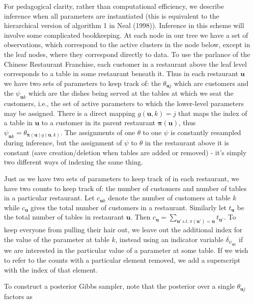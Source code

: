\documentclass[11pt]{article}
\begin{document}
For pedagogical clarity, rather than computational efficiency, we describe inference when all parameters are instantiated (this is equivalent to the hierarchical version of algorithm 1 in Neal (1998)).  Inference in this scheme will involve some complicated bookkeeping.  At each node in our tree we have a set of observations, which correspond to the active clusters in the node below, except in the leaf nodes, where they correspond directly to data.  To use the parlance of the Chinese Restaurant Franchise, each customer in a restaurant above the leaf level corresponds to a table in some restaurant beneath it.  Thus in each restaurant $\mathbf{u}$ we have two sets of parameters to keep track of: the $\theta_{\mathbf{u}j}$ which are customers and the $\psi_{\mathbf{u}k}$ which are the dishes being served at the tables at which we seat the customers, i.e., the set of active parameters to which the lower-level parameters may be assigned.  There is a direct mapping $g(\mathbf{u},k) = j$ that maps the index of a table in $\mathbf{u}$ to a customer in its parent restaurant $\mathbf{\pi(u)}$, thus $\psi_{\mathbf{u}k} = \theta_{\mathbf{\pi(u)}g(\mathbf{u},k)}$.  The assignments of one $\theta$ to one $\psi$ is constantly resampled during inference, but the assignment of $\psi$ to $\theta$ in the restaurant above it is constant (save creation/deletion when tables are added or removed) - it's simply two different ways of indexing the same thing.

Just as we have two sets of parameters to keep track of in each restaurant, we have two counts to keep track of: the number of customers and number of tables in a particular restaurant.  Let $c_{\mathbf{u}k}$ denote the number of customers at table $k$ while $c_{\mathbf{u}}$ gives the total number of customers in a restaurant.  Similarly let $t_{\mathbf{u}}$ be the total number of tables in restaurant $\mathbf{u}$.  Then $c_{\mathbf{u}} = \sum_{\mathbf{u}' \, s.t. \, \pi(\mathbf{u}') = \mathbf{u}} t_{\mathbf{u}'}$.  To keep everyone from pulling their hair out, we leave out the additional index for the value of the parameter at table $k$, instead using an indicator variable $\delta_{\psi_{\mathbf{u}k}}$ if we are interested in the particular value of a parameter at some table.  If we wish to refer to the counts with a particular element removed, we add a superscript with the index of that element.

To construct a posterior Gibbs sampler, note that the posterior over a single $\theta_{\mathbf{u}j}$ factors as 
\end{document}
